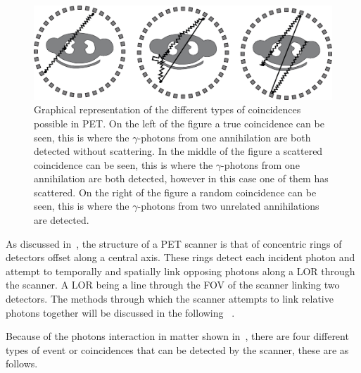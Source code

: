             \begin{figure}
                \centering
                
                \includegraphics[width=1.0\linewidth]{figures/background_coincidence.png}
                
                \captionsetup{singlelinecheck=false, justification=raggedright}
                \caption{Graphical representation of the different types of coincidences possible in \gls{PET}. On the left of the figure a true coincidence can be seen, this is where the $\gamma$-photons from one annihilation are both detected without scattering. In the middle of the figure a scattered coincidence can be seen, this is where the $\gamma$-photons from one annihilation are both detected, however in this case one of them has scattered. On the right of the figure a random coincidence can be seen, this is where the $\gamma$-photons from two unrelated annihilations are detected.} \label{fig:data_acquisition_coincidence}
            \end{figure}
            
            As discussed in~, the structure of a \gls{PET} scanner is that of concentric rings of detectors offset along a central axis. These rings detect each incident photon and attempt to temporally and spatially link opposing photons along a \gls{LOR} through the scanner. A \gls{LOR} being a line through the \gls{FOV} of the scanner linking two detectors. The methods through which the scanner attempts to %
            link relative photons together will be discussed in the following %
            ~.
            
            Because of the photons interaction in matter shown in~, there are four different types of event or coincidences that can be detected by the scanner, these are as follows.
            
